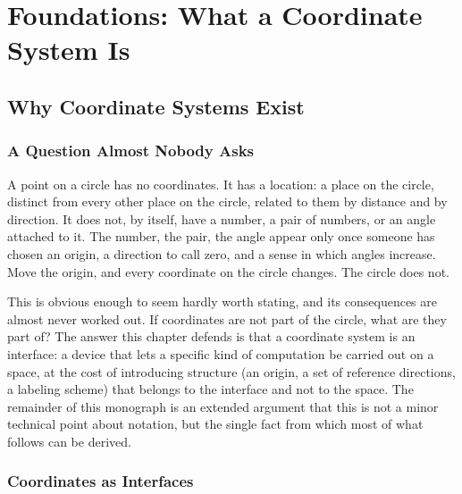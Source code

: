 \documentclass[11pt,fleqn]{book}
\numberwithin{equation}{chapter}
\theoremstyle{plain}
\theoremstyle{definition}
\theoremstyle{remark}
\providecommand{\enquote}[1]{``#1''}
\begin{document}
\tableofcontents

\mainmatter

\part{Foundations: What a Coordinate System Is}

\providecommand{\enquote}[1]{``#1''}

\chapter{Why Coordinate Systems Exist}

\section{A Question Almost Nobody Asks}

A point on a circle has no coordinates. It has a location: a place on the circle, distinct from every other place on the circle, related to them by distance and by direction. It does not, by itself, have a number, a pair of numbers, or an angle attached to it. The number, the pair, the angle appear only once someone has chosen an origin, a direction to call zero, and a sense in which angles increase. Move the origin, and every coordinate on the circle changes. The circle does not.

This is obvious enough to seem hardly worth stating, and its consequences are almost never worked out. If coordinates are not part of the circle, what are they part of? The answer this chapter defends is that a coordinate system is an interface: a device that lets a specific kind of computation be carried out on a space, at the cost of introducing structure (an origin, a set of reference directions, a labeling scheme) that belongs to the interface and not to the space. The remainder of this monograph is an extended argument that this is not a minor technical point about notation, but the single fact from which most of what follows can be derived.

\section{Coordinates as Interfaces}
\end{document}
